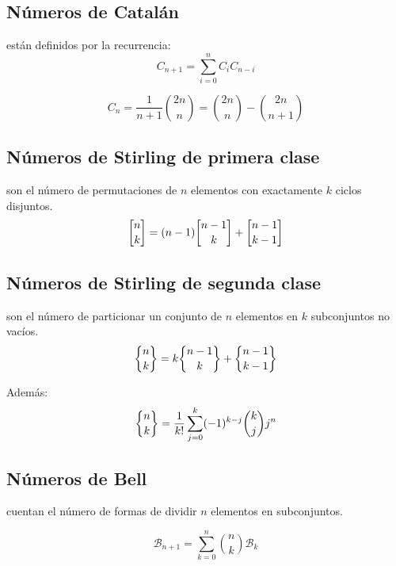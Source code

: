     \subsection{Números de Catal\'an} están definidos por la recurrencia:
      \begin{equation*}
        C_{n+1} = \sum_{i=0}^nC_iC_{n-i}
      \end{equation*}

      \begin{equation*}
        C_n = \frac{1}{n+1}\binom{2n}{n} = \binom{2n}{n} - \binom{2n}{n+1}
      \end{equation*}

    \subsection{Números de Stirling de primera clase} son el número de permutaciones de $n$ elementos con exactamente $k$ ciclos disjuntos.
      \begin{equation*}
        \stirlingfirst{n}{k} = (n-1)\stirlingfirst{n-1}{k} + \stirlingfirst{n-1}{k-1}
      \end{equation*}

    \subsection{Números de Stirling de segunda clase} son el número de particionar un conjunto de
      $n$ elementos en $k$ subconjuntos no vacíos.
      \begin{equation*}
        \stirlingsecond{n}{k} = k\stirlingsecond{n-1}{k} + \stirlingsecond{n-1}{k-1}
      \end{equation*}

      Además:
      \begin{equation*}
        \stirlingsecond{n}{k} = \frac{1}{k!}\sum_{j=0}^k (-1)^{k-j} \binom{k}{j} j^n
      \end{equation*}

      \subsection{Números de Bell} cuentan el número de formas de dividir $n$ elementos en subconjuntos.

      \begin{equation*}
        \mathcal{B}_{n+1} = \sum_{k=0}^n \binom{n}{k} \mathcal{B}_k
      \end{equation*}

